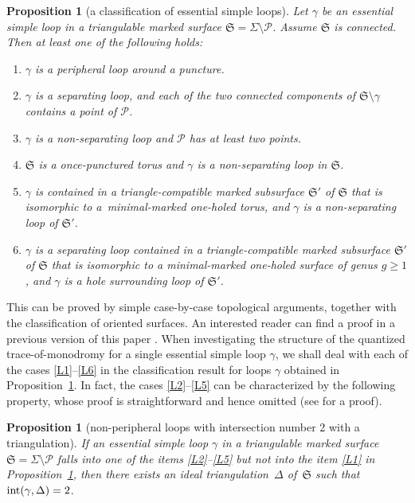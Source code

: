 \documentclass[pdftex]{sigma}
\numberwithin{equation}{section}
\newtheorem{Proposition}[Theorem]{Proposition}
\theoremstyle{definition}
\begin{document}
\begin{Proposition}[a classification of essential simple loops]
\label{prop:loop_classification}
Let $\gamma$ be an essential simple loop in a triangulable marked surface $\mathfrak{S} = \Sigma\setminus \mathcal{P}$. Assume $\mathfrak{S}$ is connected. Then at least one of the following holds:
\begin{enumerate}[label={\rm (L\arabic*)}]\itemsep=0pt
\item\label{L1} $\gamma$ is a peripheral loop around a puncture.
\item\label{L2} $\gamma$ is a separating loop, and each of the two connected components of $\mathfrak{S} \setminus \gamma$ contains a point of $\mathcal{P}$.
\item\label{L3} $\gamma$ is a non-separating loop and $\mathcal{P}$ has at least two points.
\item\label{L4} $\mathfrak{S}$ is a once-punctured torus and $\gamma$ is a non-separating loop in $\mathfrak{S}$.
\item\label{L5} $\gamma$ is contained in a triangle-compatible marked subsurface $\mathfrak{S}'$ of $\mathfrak{S}$ that is isomorphic to a~minimal-marked one-holed torus, and $\gamma$ is a non-separating loop of $\mathfrak{S}'$.
\item\label{L6} $\gamma$ is a separating loop contained in a triangle-compatible marked subsurface $\mathfrak{S}'$ of $\mathfrak{S}$ that is isomorphic to a minimal-marked one-holed surface of genus $g\ge 1$, and $\gamma$ is a hole surrounding loop of $\mathfrak{S}'$.
\end{enumerate}
\end{Proposition}
This can be proved by simple case-by-case topological arguments, together with the classification of oriented surfaces. An interested reader can find a proof in a previous version of this paper \cite{ver3}.
When investigating the structure of the quantized trace-of-monodromy  for a single essential simple loop $\gamma$, we shall deal with each of the cases \ref{L1}--\ref{L6} in the classification result for loops $\gamma$ obtained in Proposition~\ref{prop:loop_classification}. In fact, the cases \ref{L2}--\ref{L5} can be characterized by the following property, whose proof is straightforward and hence omitted (see \cite{ver3} for a proof).
\begin{Proposition}[non-peripheral loops with intersection number 2 with a triangulation]
\label{prop:2_to_5_have_intersection_2}
If an essential simple loop $\gamma$ in a triangulable marked surface $\mathfrak{S} = \Sigma\setminus\mathcal{P}$ falls into one of the items \ref{L2}--\ref{L5} but not into the item \ref{L1} in Proposition~{\rm \ref{prop:loop_classification}}, then there exists an ideal triangulation~$\Delta$ of~$\mathfrak{S}$ such that ${\rm int}(\gamma,\Delta)=2$.
\end{Proposition}
\end{document}
